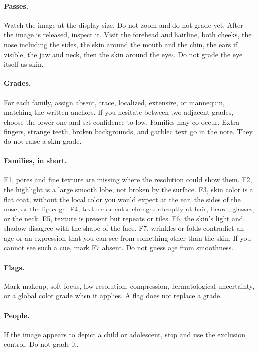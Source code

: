 \documentclass[10pt,twocolumn]{article}
\begin{document}
\paragraph{Passes.}
Watch the image at the display size. Do not zoom and do not grade yet. After the image is released, inspect it. Visit the forehead and hairline, both cheeks, the nose including the sides, the skin around the mouth and the chin, the ears if visible, the jaw and neck, then the skin around the eyes. Do not grade the eye itself as skin.

\paragraph{Grades.}
For each family, assign absent, trace, localized, extensive, or mannequin, matching the written anchors. If you hesitate between two adjacent grades, choose the lower one and set confidence to low. Families may co-occur. Extra fingers, strange teeth, broken backgrounds, and garbled text go in the note. They do not raise a skin grade.

\paragraph{Families, in short.}
F1, pores and fine texture are missing where the resolution could show them.
F2, the highlight is a large smooth lobe, not broken by the surface.
F3, skin color is a flat coat, without the local color you would expect at the ear, the sides of the nose, or the lip edge.
F4, texture or color changes abruptly at hair, beard, glasses, or the neck.
F5, texture is present but repeats or tiles.
F6, the skin's light and shadow disagree with the shape of the face.
F7, wrinkles or folds contradict an age or an expression that you can see from something other than the skin. If you cannot see such a cue, mark F7 absent. Do not guess age from smoothness.

\paragraph{Flags.}
Mark makeup, soft focus, low resolution, compression, dermatological uncertainty, or a global color grade when it applies. A flag does not replace a grade.

\paragraph{People.}
If the image appears to depict a child or adolescent, stop and use the exclusion control. Do not grade it.
\end{document}
